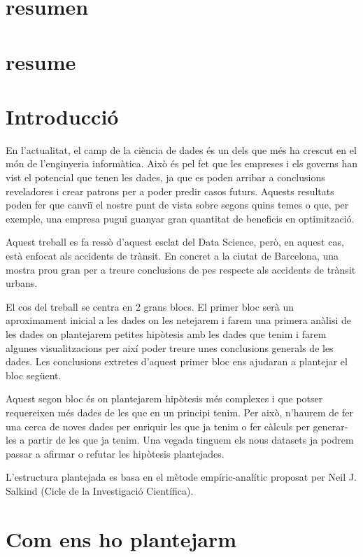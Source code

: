 \section*{resumen}
\section*{resume}
\newpage


\tableofcontents
\clearpage
\newpage
{}	
\setcounter{page}{1}
\section{Introducció}
En l'actualitat, el camp de la ciència de dades és un dels que més ha crescut en el món de l'enginyeria informàtica. Això és pel fet que les empreses i els governs han vist el potencial que tenen les dades, ja que es poden arribar a conclusions reveladores i crear patrons per a poder predir casos futurs. Aquests resultats poden fer que canviï el nostre punt de vista sobre segons quins temes o que, per exemple, una empresa pugui guanyar gran quantitat de beneficis en optimització.

Aquest treball es fa ressò d'aquest esclat del Data Science, però, en aquest cas, està enfocat als accidents de trànsit. En concret a la ciutat de Barcelona, una mostra prou gran per a treure conclusions de pes respecte als accidents de trànsit urbans.

El cos del treball se centra en 2 grans blocs. El primer bloc serà un aproximament inicial a les dades on les netejarem i farem una primera anàlisi de les dades on plantejarem petites hipòtesis amb les dades que tenim i farem algunes visualitzacions per així poder treure unes conclusions generals de les dades. Les conclusions extretes d'aquest primer bloc ens ajudaran a plantejar el bloc següent.

Aquest segon bloc és on plantejarem hipòtesis més complexes i que potser requereixen més dades de les que en un principi tenim. Per això, n'haurem de fer una cerca de noves dades per enriquir les que ja tenim o fer càlculs per generar-les a partir de les que ja tenim. Una vegada tinguem els nous datasets ja podrem passar a afirmar o refutar les hipòtesis plantejades.

L'estructura plantejada es basa en el mètode empíric-analític proposat per Neil J. Salkind (Cicle de la Investigació Científica).

\newpage
\section{Com ens ho plantejarm}

